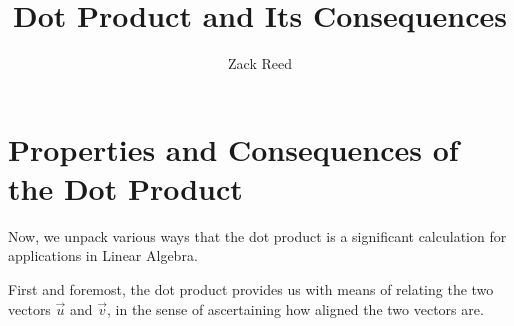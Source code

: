 \documentclass{ximera}
\author{Zack Reed}
\title{Dot Product and Its Consequences}
\begin{document}
\begin{abstract}


\end{abstract}
\maketitle

\section*{Properties and Consequences of the Dot Product}

Now, we unpack various ways that the dot product is a significant calculation for applications in Linear Algebra.

First and foremost, the dot product provides us with means of relating the two vectors $\vec{u}$ and $\vec{v}$, in the sense of ascertaining how aligned the two vectors are. 
\end{document}
